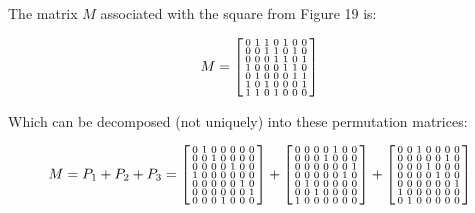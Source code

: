 \begin{example}
The matrix $M$ associated with the square from Figure 19 is:

\begin{equation}
 M = \begin{bsmallmatrix}
    0 & 1 & 1 & 0 & 1 & 0 & 0 \\
    0 & 0 & 1 & 1 & 0 & 1 & 0 \\
    0 & 0 & 0 & 1 & 1 & 0 & 1 \\
    1 & 0 & 0 & 0 & 1 & 1 & 0 \\
    0 & 1 & 0 & 0 & 0 & 1 & 1 \\
    1 & 0 & 1 & 0 & 0 & 0 & 1 \\
    1 & 1 & 0 & 1 & 0 & 0 & 0 \\
  \end{bsmallmatrix}
\end{equation}

Which can be decomposed (not uniquely) into these permutation matrices:

\begin{equation}
 M = P_1 + P_2 + P_3 = 
  \begin{bsmallmatrix}
    0 & 1 & 0 & 0 & 0 & 0 & 0 \\
    0 & 0 & 1 & 0 & 0 & 0 & 0 \\
    0 & 0 & 0 & 0 & 1 & 0 & 0 \\
    1 & 0 & 0 & 0 & 0 & 0 & 0 \\
    0 & 0 & 0 & 0 & 0 & 1 & 0 \\
    0 & 0 & 0 & 0 & 0 & 0 & 1 \\
    0 & 0 & 0 & 1 & 0 & 0 & 0 \\
  \end{bsmallmatrix}
  +
  \begin{bsmallmatrix}
    0 & 0 & 0 & 0 & 1 & 0 & 0 \\
    0 & 0 & 0 & 1 & 0 & 0 & 0 \\
    0 & 0 & 0 & 0 & 0 & 0 & 1 \\
    0 & 0 & 0 & 0 & 0 & 1 & 0 \\
    0 & 1 & 0 & 0 & 0 & 0 & 0 \\
    0 & 0 & 1 & 0 & 0 & 0 & 0 \\
    1 & 0 & 0 & 0 & 0 & 0 & 0 \\
  \end{bsmallmatrix}
  +
  \begin{bsmallmatrix}
    0 & 0 & 1 & 0 & 0 & 0 & 0 \\
    0 & 0 & 0 & 0 & 0 & 1 & 0 \\
    0 & 0 & 0 & 1 & 0 & 0 & 0 \\
    0 & 0 & 0 & 0 & 1 & 0 & 0 \\
    0 & 0 & 0 & 0 & 0 & 0 & 1 \\
    1 & 0 & 0 & 0 & 0 & 0 & 0 \\
    0 & 1 & 0 & 0 & 0 & 0 & 0 \\
  \end{bsmallmatrix}
\end{equation}


\end{example}
